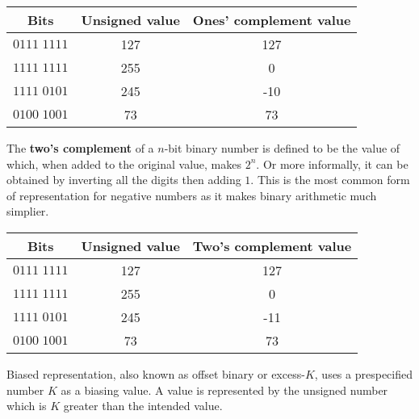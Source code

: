 \begin{example}
    \hspace{0em}
    \begin{center}
        \begin{tabular}{ccc}
            \toprule
            Bits & Unsigned value & Ones' complement value \\
            \midrule
            $0111 \; 1111$ & 127 & 127 \\
            $1111 \; 1111$ & 255 & 0 \\
            $1111 \; 0101$ & 245 & -10 \\
            $0100 \; 1001$ & 73 & 73 \\ 
            \bottomrule
        \end{tabular}
    \end{center}
\end{example}

\begin{definition}
    The \textbf{two's complement} of a $n$-bit binary number is defined to be the value of which, when added to the original value, makes $2^n$. Or more informally, it can be obtained by inverting all the digits then adding $1$. This is the most common form of representation for negative numbers as it makes binary arithmetic much simplier.
\end{definition}

\begin{example}
    \hspace{0em}
    \begin{center}
        \begin{tabular}{ccc}
            \toprule
            Bits & Unsigned value & Two's complement value \\
            \midrule
            $0111 \; 1111$ & 127 & 127 \\
            $1111 \; 1111$ & 255 & 0 \\
            $1111 \; 0101$ & 245 & -11 \\
            $0100 \; 1001$ & 73 & 73 \\ 
            \bottomrule
        \end{tabular}
    \end{center}
\end{example}

\begin{definition}
    Biased representation, also known as offset binary or excess-$K$, uses a prespecified number $K$ as a biasing value. A value is represented by the unsigned number which is $K$ greater than the intended value.
\end{definition}

